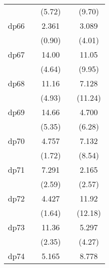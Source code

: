 {\begin{tabular}{l*{4}{c}}
            &                     &      (5.72)         &                     &      (9.70)         \\
[1em]
dp66        &                     &       2.361         &                     &       3.089\sym{***}\\
            &                     &      (0.90)         &                     &      (4.01)         \\
[1em]
dp67        &                     &       14.00\sym{***}&                     &       11.05\sym{***}\\
            &                     &      (4.64)         &                     &      (9.95)         \\
[1em]
dp68        &                     &       11.16\sym{***}&                     &       7.128\sym{***}\\
            &                     &      (4.93)         &                     &     (11.24)         \\
[1em]
dp69        &                     &       14.66\sym{***}&                     &       4.700\sym{***}\\
            &                     &      (5.35)         &                     &      (6.28)         \\
[1em]
dp70        &                     &       4.757         &                     &       7.132\sym{***}\\
            &                     &      (1.72)         &                     &      (8.54)         \\
[1em]
dp71        &                     &       7.291\sym{**} &                     &       2.165\sym{*}  \\
            &                     &      (2.59)         &                     &      (2.57)         \\
[1em]
dp72        &                     &       4.427         &                     &       11.92\sym{***}\\
            &                     &      (1.64)         &                     &     (12.18)         \\
[1em]
dp73        &                     &       11.36\sym{*}  &                     &       5.297\sym{***}\\
            &                     &      (2.35)         &                     &      (4.27)         \\
[1em]
dp74        &                     &       5.165         &                     &       8.778\sym{***}\\

\end{tabular}}
